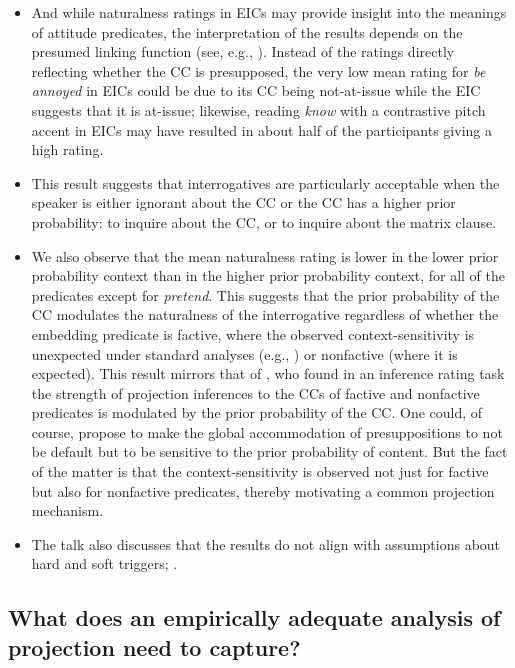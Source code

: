 \documentclass[11pt,fleqn]{article}
\newcommand{\6}{\mbox{$[\hspace*{-.6mm}[$}}
\newcommand{\9}{\mbox{$]\hspace*{-.6mm}]$}}
\begin{document}
\begin{itemize}

\item And while naturalness ratings in EICs may provide insight into the meanings of attitude predicates, the interpretation of the results depends on the presumed linking function (see, e.g., \citealt{sprouse2018}). Instead of the ratings directly reflecting whether the CC is presupposed, the very low mean rating for {\em be annoyed} in EICs could be due to its CC being not-at-issue while the EIC suggests that it is at-issue; likewise, reading {\em know} with a contrastive pitch accent in EICs may have resulted in about half of the participants giving a high rating.


\item This result suggests that interrogatives are particularly acceptable when the speaker is either ignorant about the CC or the CC has a higher prior probability: to inquire about the CC, or to inquire about the matrix clause. 

\item We also observe that the mean naturalness rating is lower in the lower prior probability context than in the higher prior probability context, for all of the predicates except for {\em pretend}. This suggests that the prior probability of the CC modulates the naturalness of the interrogative regardless of whether the embedding predicate is factive, where the observed context-sensitivity is unexpected under standard analyses (e.g., \citealt{heim83,vds92}) or nonfactive (where it is expected). This result mirrors that of \citealt{degen-tonhauser-openmind}, who found in an inference rating task the strength of projection inferences to the CCs of factive and nonfactive predicates is modulated by the prior probability of the CC. One could, of course, propose to make the global accommodation of presuppositions to not be default but to be sensitive to the prior probability of content. But the fact of the matter is that the context-sensitivity is observed not just for factive but also for nonfactive predicates, thereby motivating a common projection mechanism.

\item The talk also discusses that the results do not align with assumptions about hard and soft triggers; \citealt{simons01,abusch10}.

\end{itemize}

\subsection{What does an empirically adequate analysis of projection need to capture?}
\end{document}
